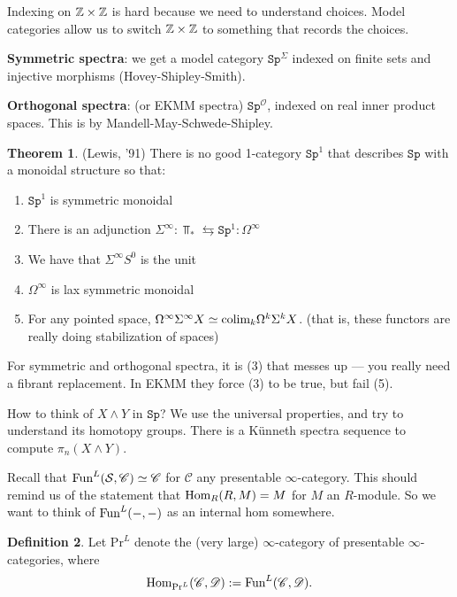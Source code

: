 \documentclass[12pt]{amsart}
\theoremstyle{definition}
\newtheorem{theorem}{Theorem}[section]
\newtheorem{definition}[theorem]{Definition}
\renewcommand{\O}{\mathcal{O}}
\let\smashprod\wedge
\providecommand{\Sp}{\texttt{Sp}}
\providecommand{\Sp}{\text{Sp}}
\providecommand{\Pr}{\text{Pr}}
\begin{document}
Indexing on $\mathbb{Z} \times \mathbb{Z}$ is hard because we need to understand choices. Model categories allow us to switch $\mathbb{Z} \times \mathbb{Z}$ to something that records the choices.

\textbf{Symmetric spectra}: we get a model category $\Sp^\Sigma$ indexed on finite sets and injective morphisms (Hovey-Shipley-Smith).

\textbf{Orthogonal spectra}: (or EKMM spectra) $\Sp^\O$, indexed on real inner product spaces. This is by Mandell-May-Schwede-Shipley.

\begin{theorem} (Lewis, '91) There is no good 1-category $\Sp^1$ that describes $\Sp$ with a monoidal structure so that:
\begin{enumerate}
    \item $\Sp^1$ is symmetric monoidal
    \item There is an adjunction $\Sigma^\infty: \Top_\ast \leftrightarrows \Sp^1 : \Omega^\infty$
    \item We have that $\Sigma^\infty S^0$ is the unit
    \item $\Omega^\infty$ is lax symmetric monoidal
    \item For any pointed space, $\Omega^\infty \Sigma^\infty X \simeq \text{colim}_k \Omega^k \Sigma^k X$. (that is, these functors are really doing stabilization of spaces)
\end{enumerate}
\end{theorem}

For symmetric and orthogonal spectra, it is (3) that messes up --- you really need a fibrant replacement. In EKMM they force (3) to be true, but fail (5).

How to think of $X \smashprod Y$ in $\Sp$? We use the universal properties, and try to understand its homotopy groups. There is a K\"unneth spectra sequence to compute $\pi_n(X \smashprod Y)$.

Recall that $\text{Fun}^L(\mathcal{S},\mathscr{C}) \simeq \mathscr{C}$ for $\mathscr{C}$ any presentable $\infty$-category. This should remind us of the statement that $\text{Hom}_R(R,M) = M$ for $M$ an $R$-module. So we want to think of $\text{Fun}^L(-,-)$ as an internal hom somewhere.

\begin{definition} Let $\Pr^L$ denote the (very large) $\infty$-category of presentable $\infty$-categories, where
\begin{align*}
    \Hom_{\Pr^L}(\mathscr{C},\mathscr{D}) := \Fun^L(\mathscr{C},\mathscr{D}).
\end{align*}
\end{definition}
\end{document}

